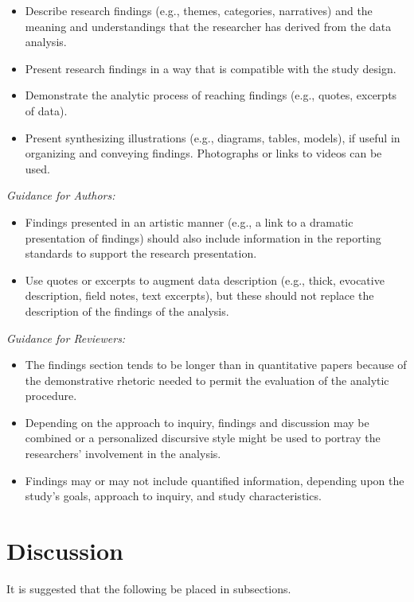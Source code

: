 \documentclass[acmsmall,screen,anonymous,review]{acmart}
\begin{document}
\begin{itemize}
    \item Describe research findings (e.g., themes, categories, narratives) and the meaning and understandings that the researcher has derived from the data analysis.
    \item Present research findings in a way that is compatible with the study design.
    \item Demonstrate the analytic process of reaching findings (e.g., quotes, excerpts of data).
    \item Present synthesizing illustrations (e.g., diagrams, tables, models), if useful in organizing and conveying findings. Photographs or links to videos can be used.
\end{itemize}

\textit{Guidance for Authors:}
\begin{itemize}
    \item Findings presented in an artistic manner (e.g., a link to a dramatic presentation of findings) should also include information in the reporting standards to support the research presentation.
    \item Use quotes or excerpts to augment data description (e.g., thick, evocative description,
    field notes, text excerpts), but these should not replace the description of the findings of the analysis.
\end{itemize}

\textit{Guidance for Reviewers:}

\begin{itemize}
    \item The findings section tends to be longer than in quantitative papers because of the demonstrative rhetoric needed to permit the evaluation of the analytic procedure.
    \item Depending on the approach to inquiry, findings and discussion may be combined or a personalized discursive style might be used to portray the researchers’ involvement in the analysis.
    \item Findings may or may not include quantified information, depending upon the study’s goals, approach to inquiry, and study characteristics.
\end{itemize}

\section{Discussion}

It is suggested that the following be placed in subsections.
\end{document}

